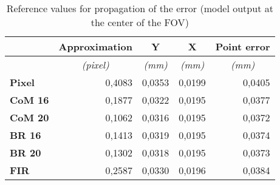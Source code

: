 \begin{table}[h!]
  \centering
  \begin{tabular}{|l|r|r|r|r|}
    \hline
    \multirow{2}{*}{}  & \multicolumn{1}{c|}{\textbf{Approximation}} & \multicolumn{1}{c|}{\textbf{Y}}    & \multicolumn{1}{c|}{\textbf{X}}    & \multicolumn{1}{c|}{\textbf{Point error}} \\
	\hline
                       & \multicolumn{1}{c|}{\textit{(pixel)}}    & \multicolumn{1}{c|}{\textit{(mm)}} & \multicolumn{1}{c|}{\textit{(mm)}} & \multicolumn{1}{c|}{\textit{(mm)}}  \\
	\hline
    \textbf{Pixel}    & 0,4083    & 0,0353    & 0,0199    & 0,0405 \\
    \hline
    \textbf{CoM 16}   & 0,1877    & 0,0322    & 0,0195    & 0,0377 \\
    \hline
    \textbf{CoM 20}   & 0,1062    & 0,0316    & 0,0195    & 0,0372 \\
    \hline
    \textbf{BR 16}    & 0,1413    & 0,0319    & 0,0195    & 0,0374 \\
    \hline
    \textbf{BR 20}    & 0,1302    & 0,0318    & 0,0195    & 0,0373 \\
    \hline
    \textbf{FIR}      & 0,2587    & 0,0330    & 0,0196    & 0,0384 \\
    \hline
  \end{tabular}
  
  \caption{Reference values for propagation of the error (model output at the center of the \acs{FOV})}
  \label{tab:exp2:refereces}
\end{table}